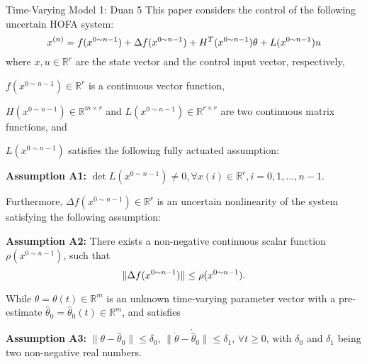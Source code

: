 \documentclass{beamer}
\begin{document}
\begin{frame}{Time-Varying Model 1: Duan 5}
This paper considers the control of the following uncertain HOFA system:
\begin{equation}
x^{(n)} = f(x^{0\sim n-1}) + \Delta f(x^{0\sim n-1}) + H^T(x^{0\sim n-1})\theta + L(x^{0\sim n-1})u \notag
\end{equation}
where \( x, u \in \mathbb{R}^r \) are the state vector and the control input vector, respectively, 

\( f(x^{0\sim n-1}) \in \mathbb{R}^r \) is a continuous vector function, 

\( H(x^{0\sim n-1}) \in \mathbb{R}^{m \times r} \) and \( L(x^{0\sim n-1}) \in \mathbb{R}^{r \times r} \) are two continuous matrix functions, and 

\( L(x^{0\sim n-1}) \) satisfies the following fully actuated assumption:

\textbf{Assumption A1:} \( \det L(x^{0\sim n-1}) \neq 0, \forall x(i) \in \mathbb{R}^r, i = 0, 1, \ldots, n-1. \)

Furthermore, \( \Delta f(x^{0\sim n-1}) \in \mathbb{R}^r \) is an uncertain nonlinearity of the system satisfying the following assumption:

\textbf{Assumption A2:} There exists a non-negative continuous scalar function \( \rho(x^{0\sim n-1}) \), such that
\begin{equation}
\| \Delta f(x^{0\sim n-1}) \| \leq \rho(x^{0\sim n-1}). \notag
\end{equation}

While \(\theta = \theta(t) \in \mathbb{R}^m\) is an unknown \alert{time-varying} parameter vector with a pre-estimate \(\hat{\theta}_0 = \hat{\theta}_0(t) \in \mathbb{R}^m\), and satisfies

\textbf{Assumption A3:} \(\|\theta - \hat{\theta}_0\| \leq \delta_0\), \(\|\dot{\theta} - \dot{\hat{\theta}}_0\| \leq \delta_1\), \(\forall t \geq 0\), with \(\delta_0\) and \(\delta_1\) being two non-negative real numbers.

\end{frame}
\end{document}
